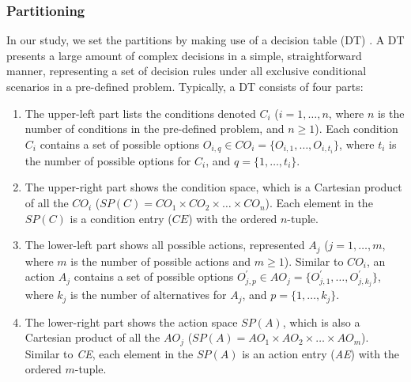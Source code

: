 \documentclass[10pt,journal,compsoc]{IEEEtran}
\begin{document}
\subsubsection{Partitioning}
\label{sec:partition}

In our study, we set the partitions by making use of a decision table (DT) \cite{gettys1986if}.
A DT presents a large amount of complex decisions in a simple, straightforward manner, representing a set of decision rules under all exclusive conditional scenarios in a pre-defined problem.
Typically, a DT consists of four parts:

\begin{enumerate}
	\item
	The upper-left part lists the conditions denoted $C_i$ ($i = 1, \ldots, n$, where $n$ is the number of conditions in the pre-defined problem,
    and $n \ge 1$).
	Each condition $C_i$ contains a set of possible options $O_{i,q} \in CO_i = \{O_{i,1}, \ldots, O_{i,t_{i}}\}$, where $t_i$ is the number of
    possible options for $C_i$, and $q = \{1,\ldots,t_i\}$.
	
	\item
	The upper-right part shows the condition space, which is a Cartesian product of all the $CO_i$	($SP(C) = CO_1 \times CO_2 \times \ldots \times CO_n$).
	Each element in the $SP(C)$ is a condition entry ($CE$) with the ordered $n$-tuple.
	
	\item
	The lower-left part shows all possible actions, represented $A_j$ ($j = 1, \ldots, m$, where $m$ is the number of possible actions and $m \ge 1$).
	Similar to $CO_i$, an action $A_j$ contains a set of possible options $O_{j,p}^{'} \in AO_j = \{O_{j,1}^{'}, \ldots, O_{j,k_{j}}^{'}\}$, where $k_j$ is the number of alternatives for $A_j$, and $p = \{1,\ldots,k_j\}$.

	\item
	The lower-right part shows the action space $SP(A)$, which is also a Cartesian product of all the $AO_j$ ($SP(A) = AO_1 \times AO_2 \times \ldots \times AO_m$).
	Similar to \emph{CE}, each element in the $SP(A)$ is an action entry (\emph{AE}) with the ordered $m$-tuple.
	
\end{enumerate}
\end{document}
